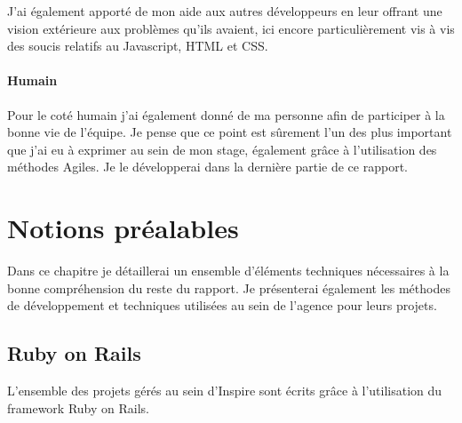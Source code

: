 \documentclass[12pt,a4paper]{book}
\begin{document}
J'ai également apporté de mon aide aux autres développeurs en leur offrant une vision extérieure aux problèmes qu'ils avaient, ici encore particulièrement vis à vis des soucis relatifs au Javascript, HTML et CSS. 

\subsubsection{Humain}

Pour le coté humain j'ai également donné de ma personne afin de participer à la bonne vie de l'équipe. Je pense que ce point est sûrement l'un des plus important que j'ai eu à exprimer au sein de mon stage, également grâce à l'utilisation des méthodes Agiles. Je le développerai dans la dernière partie de ce rapport.

\chapter{Notions préalables}

Dans ce chapitre je détaillerai un ensemble d'éléments techniques nécessaires à la bonne compréhension du reste du rapport. Je présenterai également les méthodes de développement et techniques utilisées au sein de l'agence pour leurs projets.

\section{Ruby on Rails}

L'ensemble des projets gérés au sein d'Inspire sont écrits grâce à l'utilisation du framework Ruby on Rails.
\end{document}
